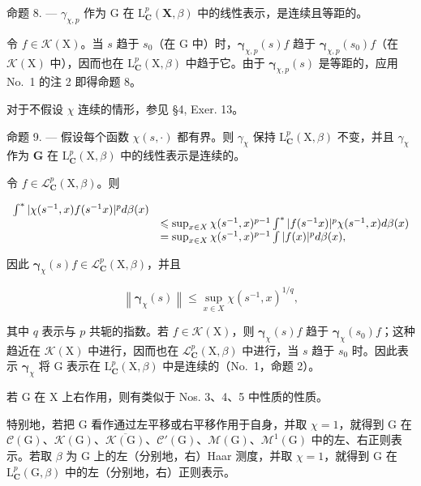 命题 8. --- \(\gamma_{\chi,p}\) 作为 G 在 \(\mathrm{L}_{\mathbf{C}}^{p}(\mathbf{X},\beta)\) 中的线性表示，是连续且等距的。

令 \(f \in \mathcal{K}(\mathrm{X})\)。当 \(s\) 趋于 \(s_0\)（在 \(\mathrm{G}\) 中）时，\(\boldsymbol{\gamma}_{\chi,p}(s)f\) 趋于 \(\boldsymbol{\gamma}_{\chi,p}(s_0)f\)（在 \(\mathcal{K}(\mathrm{X})\) 中），因而也在 \(\mathrm{L}_{\mathbf{C}}^p (\mathrm{X},\beta)\) 中趋于它。由于 \(\boldsymbol{\gamma}_{\chi,p}(s)\) 是等距的，应用 No.~1 的注 2 即得命题 8。

对于不假设 \(\chi\) 连续的情形，参见 §4, Exer. 13。

命题 9. --- 假设每个函数 \(\chi(s,\cdot)\) 都有界。则 \(\gamma_{\chi}\) 保持 \(\mathrm{L}_{\mathbf{C}}^{p}(\mathrm{X},\beta)\) 不变，并且 \(\gamma_{\chi}\) 作为 \(\mathbf{G}\) 在 \(\mathrm{L}_{\mathbf{C}}^{p}(\mathrm{X},\beta)\) 中的线性表示是连续的。

令 \(f\in \mathcal{L}_{\mathbf{C}}^{p}(\mathrm{X},\beta)\)。则

\[
\begin{array}{r l} \int^ {*} | \chi (s ^ {- 1}, x) f (s ^ {- 1} x) | ^ {p} d \beta (x) \\ & \leqslant \sup _ {x \in X} \chi (s ^ {- 1}, x) ^ {p - 1} \int^ {*} | f (s ^ {- 1} x) | ^ {p} \chi (s ^ {- 1}, x) d \beta (x) \\ & = \sup _ {x \in X} \chi (s ^ {- 1}, x) ^ {p - 1} \int | f (x) | ^ {p} d \beta (x), \end{array}
\]

因此 \(\pmb{\gamma}_{\chi}(s)f\in \mathcal{L}_{\mathbf{C}}^{p}(\mathrm{X},\beta)\)，并且

\[
\left\| \boldsymbol {\gamma} _ {\chi} (s) \right\| \leqslant \sup _ {x \in X} \chi (s ^ {- 1}, x) ^ {1 / q},\tag{5}
\]

其中 \(q\) 表示与 \(p\) 共轭的指数。若 \(f \in \mathcal{K}(\mathrm{X})\)，则 \(\boldsymbol{\gamma}_{\chi}(s)f\) 趋于 \(\boldsymbol{\gamma}_{\chi}(s_0)f\)；这种趋近在 \(\mathcal{K}(\mathrm{X})\) 中进行，因而也在 \(\mathcal{L}_{\mathbf{C}}^{p}(\mathrm{X},\beta)\) 中进行，当 \(s\) 趋于 \(s_0\) 时。因此表示 \(\boldsymbol{\gamma}_{\chi}\) 将 \(\mathrm{G}\) 表示在 \(\mathrm{L}_{\mathbf{C}}^{p}(\mathrm{X},\beta)\) 中是连续的（No.~1，命题 2）。

若 G 在 X 上右作用，则有类似于 Nos. 3、4、5 中性质的性质。

特别地，若把 G 看作通过左平移或右平移作用于自身，并取 \(\chi = 1\)，就得到 G 在 \(\mathcal{C}(\mathrm{G})\)、\(\mathcal{K}(\mathrm{G})\)、\(\overline{\mathcal{K}(\mathrm{G})}\)、\(\mathcal{C}'(\mathrm{G})\)、\(\mathcal{M}(\mathrm{G})\)、\(\mathcal{M}^{1}(\mathrm{G})\) 中的左、右正则表示。若取 \(\beta\) 为 G 上的左（分别地，右）Haar 测度，并取 \(\chi = 1\)，就得到 G 在 \(\mathrm{L}_{\mathbf{C}}^{p}(\mathrm{G}, \beta)\) 中的左（分别地，右）正则表示。

